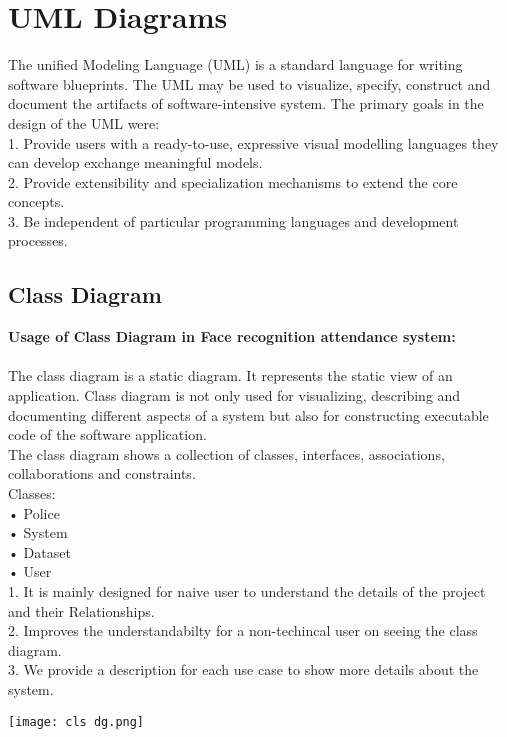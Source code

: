 \documentclass[12pt,a4paper]{report}
\begin{document}
\section{\large UML Diagrams}
The unified Modeling Language (UML) is a standard language for writing software blueprints. The UML may be used to visualize, specify, construct and document the artifacts of software-intensive system.
The primary goals in the design of the UML were:\\
1. Provide users with a ready-to-use, expressive visual modelling languages they can develop exchange meaningful models.\\ 
2. Provide extensibility and specialization mechanisms to extend the core concepts.\\
3. Be independent of particular programming languages and development processes.\\

\subsection{\Large Class Diagram}
\textbf{Usage of Class Diagram in Face recognition attendance system:}\\ \\
The class diagram is a static diagram. It represents the static view of an application. Class diagram is not only used for visualizing, describing and documenting different aspects of a system but also for constructing executable code of the software application.\\
The class diagram shows a collection of classes, interfaces, associations, collaborations and constraints.\\
Classes:\\
• Police\\
• System\\
• Dataset\\
• User\\
1. It is mainly designed for naive user to understand the details of the project and their Relationships.\\
2. Improves the understandabilty for a non-techincal user on seeing the class diagram.\\
3. We provide a description for each use case to show more details about the system.
\begin{center}
\texttt{[image: cls dg.png]}
\begin{figure}[h!]
\caption{}
\end{figure}
\end{center}
\end{document}
